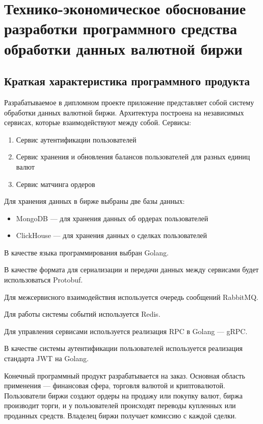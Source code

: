 \section{Технико-экономическое обоснование разработки программного средства обработки данных валютной биржи}\label{sec:economics}

\subsection{Краткая характеристика программного продукта}

Разрабатываемое в дипломном проекте приложение представляет собой систему обработки данных валютной биржи. Архитектура построена на независимых сервисах, которые взаимодействуют между собой. Сервисы:
\begin{enumerate}
    \item Сервис аутентификации пользователей
    \item Сервис хранения и обновления балансов пользователей для разных единиц валют
    \item Сервис матчинга ордеров
\end{enumerate}

Для хранения данных в бирже выбраны две базы данных:
\begin{itemize}
    \item MongoDB — для хранения данных об ордерах пользователей
    \item ClickHouse — для хранения данных о сделках пользователей
\end{itemize}

В качестве языка программирования выбран Golang.

В качестве формата для сериализации и передачи данных между сервисами будет использоваться Protobuf.

Для межсервисного взаимодействия используется очередь сообщений RabbitMQ.

Для работы системы событий используется Redis.

Для управления сервисами используется реализация RPC в Golang — gRPC.

В качестве системы аутентификации пользователей используется реализация стандарта JWT на Golang.

Конечный программный продукт разрабатывается на заказ. Основная область применения — финансовая сфера, торговля валютой и криптовалютой.
Пользователи биржи создают ордеры на продажу или покупку валют, биржа производит торги, и у пользователей происходят переводы купленных или проданных средств. Владелец биржи получает комиссию с каждой сделки.


